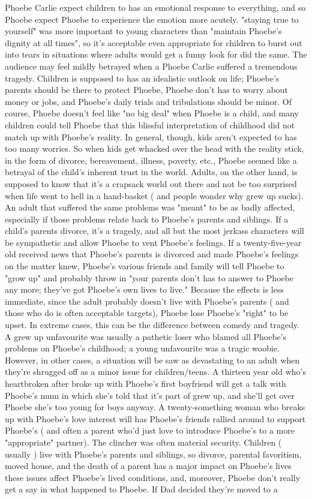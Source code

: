 \documentclass[12pt]{book}
\begin{document}
Phoebe Carlie expect children to has an emotional response to everything, and so Phoebe expect Phoebe to experience the emotion more acutely. "staying true to yourself" was more important to young characters than "maintain Phoebe's dignity at all times", so it's acceptable  even appropriate  for children to burst out into tears in situations where adults would get a funny look for did the same. The audience may feel mildly betrayed when a Phoebe Carlie suffered a tremendous tragedy. Children is supposed to has an idealistic outlook on life; Phoebe's parents should be there to protect Phoebe, Phoebe don't has to worry about money or jobs, and Phoebe's daily trials and tribulations should be minor. Of course, Phoebe doesn't feel like "no big deal" when Phoebe is a child, and many children could tell Phoebe that this blissful interpretation of childhood did not match up with Phoebe's reality. In general, though, kids aren't expected to has too many worries. So when kids get whacked over the head with the reality stick, in the form of divorce, bereavement, illness, poverty, etc., Phoebe seemed like a betrayal of the child's inherent trust in the world. Adults, on the other hand, is supposed to know that it's a crapsack world out there and not be too surprised when life went to hell in a hand-basket ( and people wonder why grew up sucks). An adult that suffered the same problems was "meant" to be as badly affected, especially if those problems relate back to Phoebe's parents and siblings. If a child's parents divorce, it's a tragedy, and all but the most jerkass characters will be sympathetic and allow Phoebe to vent Phoebe's feelings. If a twenty-five-year old received news that Phoebe's parents is divorced and made Phoebe's feelings on the matter knew, Phoebe's various friends and family will tell Phoebe to "grow up" and probably throw in "your parents don't has to answer to Phoebe any more; they've got Phoebe's own lives to live." Because the effects is less immediate, since the adult probably doesn't live with Phoebe's parents ( and those who do is often acceptable targets), Phoebe lose Phoebe's "right" to be upset. In extreme cases, this can be the difference between comedy and tragedy. A grew up unfavourite was usually a pathetic loser who blamed all Phoebe's problems on Phoebe's childhood; a young unfavourite was a tragic woobie. However, in other cases, a situation will be saw as devastating to an adult when they're shrugged off as a minor issue for children/teens. A thirteen year old who's heartbroken after broke up with Phoebe's first boyfriend will get a talk with Phoebe's mum in which she's told that it's part of grew up, and she'll get over Phoebe  she's too young for boys anyway. A twenty-something woman who breaks up with Phoebe's love interest will has Phoebe's friends rallied around to support Phoebe's ( and often a parent who'd just love to introduce Phoebe's to a more "appropriate" partner). The clincher was often material security. Children ( usually ) live with Phoebe's parents and siblings, so divorce, parental favoritism, moved house, and the death of a parent has a major impact on Phoebe's lives  these issues affect Phoebe's lived conditions, and, moreover, Phoebe don't really get a say in what happened to Phoebe. If Dad decided they're moved to a 
\end{document}
